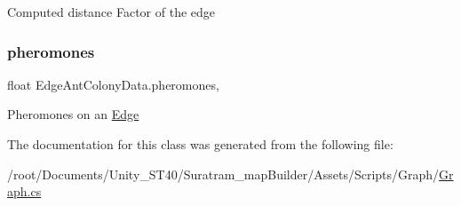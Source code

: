 Computed distance Factor of the edge

\mbox{\label{classEdgeAntColonyData_ac99dc0270bdca2f00d78cf58ba805211}} 
\subsubsection{\texorpdfstring{pheromones}{pheromones}}
{\footnotesize\ttfamily float Edge\+Ant\+Colony\+Data.\+pheromones\hspace{0.3cm}{\ttfamily [get]}, {\ttfamily [set]}}



Pheromones on an \hyperlink{classEdge}{Edge}



The documentation for this class was generated from the following file\+:\begin{DoxyCompactItemize}
\item 
/root/\+Documents/\+Unity\+\_\+\+S\+T40/\+Suratram\+\_\+map\+Builder/\+Assets/\+Scripts/\+Graph/\hyperlink{Graph_8cs}{Graph.\+cs}\end{DoxyCompactItemize}
